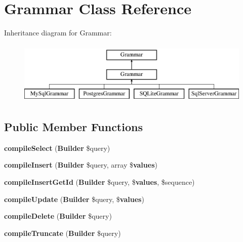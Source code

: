 \section{Grammar Class Reference}
\label{class_illuminate_1_1_database_1_1_query_1_1_grammars_1_1_grammar}
Inheritance diagram for Grammar\+:\begin{figure}[H]
\begin{center}
\leavevmode
\includegraphics[height=3.000000cm]{class_illuminate_1_1_database_1_1_query_1_1_grammars_1_1_grammar}
\end{center}
\end{figure}
\subsection*{Public Member Functions}
\begin{DoxyCompactItemize}
\item 
{\bf compile\+Select} ({\bf Builder} \$query)
\item 
{\bf compile\+Insert} ({\bf Builder} \$query, array \${\bf values})
\item 
{\bf compile\+Insert\+Get\+Id} ({\bf Builder} \$query, \${\bf values}, \$sequence)
\item 
{\bf compile\+Update} ({\bf Builder} \$query, \${\bf values})
\item 
{\bf compile\+Delete} ({\bf Builder} \$query)
\item 
{\bf compile\+Truncate} ({\bf Builder} \$query)
\end{DoxyCompactItemize}
